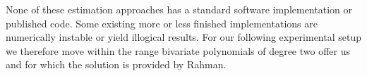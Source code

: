 None of these estimation approaches has a standard software implementation or published code. Some existing more or less finished implementations are numerically instable or yield illogical results. For our following experimental setup we therefore move within the range bivariate polynomials of degree two offer us and for which the solution is provided by Rahman.
